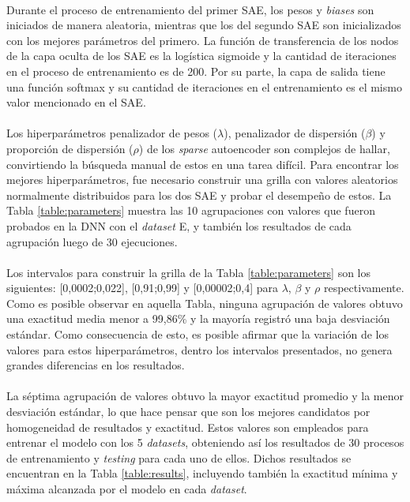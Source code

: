 \documentclass[12pt]{article}
\begin{document}
\paragraph{}
Durante el proceso de entrenamiento del primer SAE, los pesos y \textit{biases} son iniciados de manera aleatoria, mientras que los del segundo SAE son inicializados con los mejores parámetros del primero. La función de transferencia de los nodos de la capa oculta de los SAE es la logística sigmoide y la cantidad de iteraciones en el proceso de entrenamiento es de 200. Por su parte, la capa de salida tiene una función softmax y su cantidad de iteraciones en el entrenamiento es el mismo valor mencionado en el SAE. 

\paragraph{}
Los hiperparámetros penalizador de pesos ($\lambda$), penalizador de dispersión ($\beta$) y proporción de dispersión ($\rho$) de los \textit{sparse} autoencoder son complejos de hallar, convirtiendo la búsqueda manual de estos en una tarea difícil. Para encontrar los mejores hiperparámetros, fue necesario construir una grilla con valores aleatorios normalmente distribuidos para los dos SAE y probar el desempeño de estos. La Tabla \ref{table:parameters} muestra las 10 agrupaciones con valores que fueron probados en la DNN con el \textit{dataset} E, y también los resultados de cada agrupación luego de 30 ejecuciones.

\paragraph{}
Los intervalos para construir la grilla de la Tabla \ref{table:parameters} son los siguientes: [0,0002;0,022], [0,91;0,99] y [0,00002;0,4] para $\lambda$, $\beta$ y $\rho$ respectivamente. Como es posible observar en aquella Tabla, ninguna agrupación de valores obtuvo una exactitud media menor a 99,86\% y la mayoría registró una baja desviación estándar. Como consecuencia de esto, es posible afirmar que la variación de los valores para estos hiperparámetros, dentro los intervalos presentados, no genera grandes diferencias en los resultados.

\paragraph{}
La séptima agrupación de valores obtuvo la mayor exactitud promedio y la menor desviación estándar, lo que hace pensar que son los mejores candidatos por homogeneidad de resultados y exactitud. Estos valores son empleados para entrenar el modelo con los 5 \textit{datasets}, obteniendo así los resultados de 30 procesos de entrenamiento y \textit{testing} para cada uno de ellos. Dichos resultados se encuentran en la Tabla \ref{table:results}, incluyendo también la exactitud mínima y máxima alcanzada por el modelo en cada \textit{dataset}.
\end{document}
